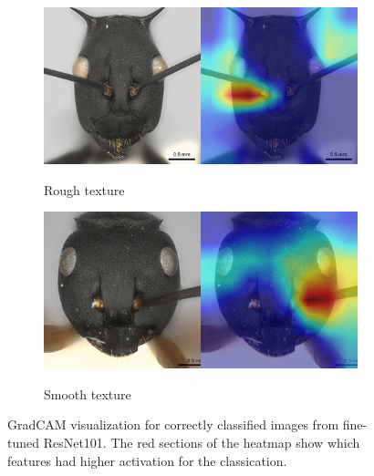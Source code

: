 \documentclass{aci}
\numberwithin{equation}{section}
\begin{document}
\begin{figure}
\begin{subfigure}{\subwidth}
        \label{fig:correct_nonideal_1554}
    \end{subfigure}
    \begin{subfigure}{\subwidth}
        \caption*{Rough texture}
        \includegraphics[width=1\linewidth]{thesis_assets/gradcam/correct_nonideal/1694.png}
        \label{fig:correct_nonideal_1694}
    \end{subfigure}
    \begin{subfigure}{\subwidth}
        \caption*{Smooth texture}
        \includegraphics[width=1\linewidth]{thesis_assets/gradcam/correct_nonideal/388.png}
        \label{fig:correct_nonideal_388}
    \end{subfigure}
    \caption{GradCAM visualization for correctly classified images from
        fine-tuned ResNet101. The red sections of the heatmap show which features
        had higher activation for the classication.}
    \label{fig:correct_images}
\end{figure}
\end{document}
